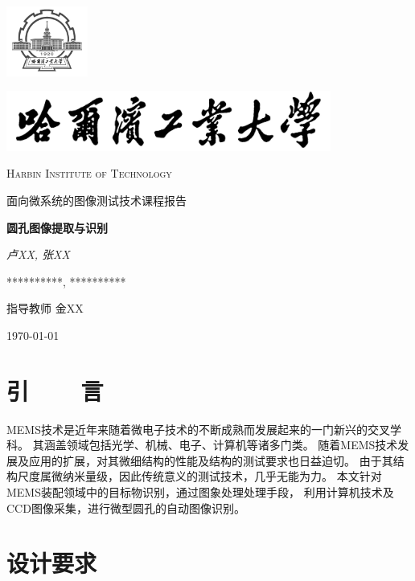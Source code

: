 \documentclass[12pt,a4paper]{report}
\begin{document}
\begin{titlepage}
    \centering
    \includegraphics[width=0.2\textwidth]{sf1.png}\par
    \vspace{1cm}
    \includegraphics[width=0.8\textwidth]{sf.jpg}\par
    \vspace{0.1cm}
    {\scshape\LARGE Harbin Institute of Technology \par}
    \vspace{1cm}
    {\kaishu\LARGE 面向微系统的图像测试技术课程报告\par}
    \vspace{1.5cm}
    {\huge\bfseries 圆孔图像提取与识别\par}
    \vspace{2cm}
    {\fangsong\Large\itshape 卢XX, 张XX\par}
    \vfill
    {**********, **********}\par

    \vfill
    指导教师	\textsc{金XX}
    \vfill
    {\large \today\par}
\end{titlepage}

\section{引~~~~言}

MEMS技术是近年来随着微电子技术的不断成熟而发展起来的一门新兴的交叉学科。 
其涵盖领域包括光学、机械、电子、计算机等诸多门类。 
随着MEMS技术发展及应用的扩展，对其微细结构的性能及结构的测试要求也日益迫切。 
由于其结构尺度属微纳米量级，因此传统意义的测试技术，几乎无能为力。 
本文针对MEMS装配领域中的目标物识别，通过图象处理处理手段，
利用计算机技术及CCD图像采集，进行微型圆孔的自动图像识别。

\section{设计要求}
\end{document}
